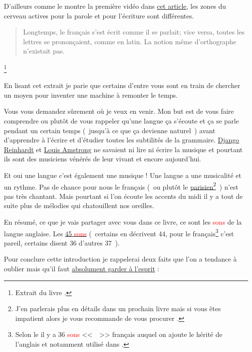 D'ailleurs comme le montre la première vidéo dans \href{http://doyouspeakenglish.fr/prescriptiviste-ou-descriptiviste/}{cet article}, les zones du cerveau actives
pour la parole et pour l'écriture sont différentes.\par

\begin{quote}
Longtemps, le français s'est écrit comme il se parlait; vice versa,
toutes les lettres se prononçaient, comme en latin. La notion même
d'orthographe n'existait pas.
\end{quote}\footnote{Extrait du livre \FL.}


En lisant cet extrait je parie que certains d'entre vous sont en train
de chercher un moyen pour inventer une machine à remonter le temps. 

Vous vous demandez sûrement où je veux en venir. Mon but est de vous
faire comprendre ou plutôt de vous rappeler qu'une langue ça s'écoute
et ça se parle pendant un certain temps (~jusqu'à ce que ça devienne
naturel~) avant d'apprendre à l'écrire et d'étudier toutes les
subtilités de la grammaire. \href{https://fr.wikipedia.org/wiki/Django\_Reinhardt}{Django Reinhardt} et \href{https://fr.wikipedia.org/wiki/Louis\_Armstrong}{Louis Amstrong} ne
savaient ni lire ni écrire la musique et pourtant ils sont des
musiciens vénérés de leur vivant et encore aujourd'hui.\par

Et oui une langue c'est également une musique ! Une langue a une
musicalité et un rythme. Pas de chance pour nous le français (~ou
plutôt le \underline{parisien}\footnote{J'en parlerais plus en détails
  dans un prochain livre mais si vous êtes impatient alors je vous
  recommande de vous procurer \FL.}~)
n'est pas très chantant. Mais pourtant si l'on écoute les accents du
midi il y a tout de suite plus de mélodies qui chatouillent nos
oreilles. 

En résumé, ce que je vais partager avec vous dans ce livre, ce
sont les \textcolor{red}{sons} de la langue anglaise. Les \href{https://pronunciationstudio.com/45-Sounds/}{45 \textcolor{red}{sons}} (~certains en
décrivent 44, pour le français\footnote{Selon le \GE il y a 36 \textcolor{red}{sons}
  <<~~>> français auquel on ajoute le 
  hérité de l'anglais et notamment utilisé dans .} c'est
pareil, certains disent 36 d'autres 37~).\par

Pour conclure cette introduction je rappelerai deux faits que l'on a tendance à oublier mais qu'il faut \underline{absolument garder à l'esprit} :

